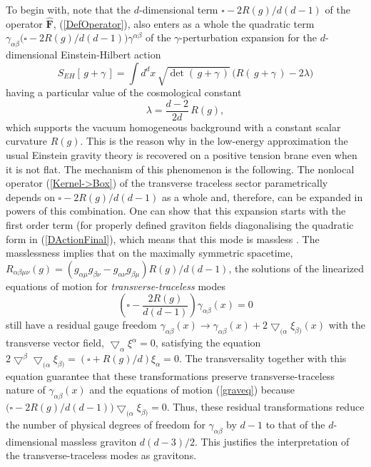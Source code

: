 \documentclass[a4paper,12pt]{article}
\newcommand{\za}{{\alpha}}   %
\newcommand{\zb}{{\beta}}    %
\newcommand{\ddim}{{d}}
\newcommand{\bBox}{\square}  %
\newcommand{\BBox}{\hat{\mathbf{F}}}  %
\newcommand{\bnabla}{\bigtriangledown}  %
\begin{document}
To begin with, note that the $d$-dimensional term
$\bBox-2R(g)/\ddim(\ddim-1)$ of the operator $\BBox$,
(\ref{DefOperator}), also enters as a whole the quadratic term
$\gamma_{\za\zb}\big(\bBox-2R(g)/\ddim(\ddim-1)\big)\gamma^{\za\zb}$
of the $\gamma$-perturbation expansion for the $\ddim$-dimensional
Einstein-Hilbert action
    \begin{equation}
    S_{EH}[\,g\!+\!\gamma\,]=
    \int d^{\ddim}x\,
    \sqrt{\det(\,g\!+\!\gamma\,)}\,
    \big(R(\,g\!+\!\gamma\,)-2\lambda\big)
    \end{equation}
having a particular value of the cosmological constant
    \begin{equation}
    \lambda=\frac{\ddim-2}{2\ddim}\,R(g),
    \end{equation}
which supports the vacuum homogeneous background with a constant
scalar curvature $R(g)$. This is the reason why in the low-energy
approximation the usual Einstein gravity theory is recovered on a
positive tension brane even when it is not flat. The mechanism of
this phenomenon is the following. The nonlocal operator
(\ref{Kernel->Box}) of the transverse traceless sector
parametrically depends on $\bBox-2R(g)/\ddim(\ddim-1)$ as a whole
and, therefore, can be expanded in powers of this combination. One
can show that this expansion starts with the first order term (for
properly defined graviton fields diagonalising the quadratic form
in (\ref{DActionFinal}), which means that this mode is massless
\cite{BWEA,BWEA2}. The masslessness implies that on the maximally
symmetric spacetime,
$R_{\alpha\beta\mu\nu}(g)=
(g_{\alpha\mu}g_{\beta\nu}-g_{\alpha\nu}g_{\beta\mu})R(g)/d(d-1)$,
the solutions of the linearized equations of motion for {\em
transverse-traceless} modes
    \begin{equation}
    \left(\bBox-\frac{2R(g)}
    {\ddim(\ddim-1)}\right)
    \gamma_{\alpha\beta}(x)=0      \label{graveq}
    \end{equation}
still have a residual gauge freedom
$\gamma_{\za\zb}(x)\rightarrow\gamma_{\za\zb}(x)
+2\bnabla_{(\za}\xi_{\zb)}(x)$ with the transverse vector field,
$\bnabla_\za\xi^\za=0$, satisfying the equation
$2\bnabla^\zb\bnabla_{(\za}\xi_{\zb)}= (\bBox+R(g)/\ddim)\xi_\za
=0$. The transversality together with this equation guarantee that
these transformations preserve transverse-traceless nature of
$\gamma_{\alpha\beta}(x)$ and the equations of motion
(\ref{graveq}) because
$\big(\bBox-2R(g)/\ddim(\ddim-1)\big)\bnabla_{(\za}\xi_{\zb)}=0$.
Thus, these residual transformations reduce the number of physical
degrees of freedom for $\gamma_{\alpha\beta}$ by $d-1$ to that of
the $d$-dimensional massless graviton $d(d-3)/2$. This justifies
the interpretation of the transverse-traceless modes as gravitons.
\end{document}
